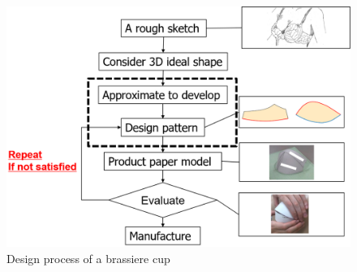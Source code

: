 \documentclass[E]{scitrans}
\begin{document}
\begin{figure}[h!]
	\centering
	\includegraphics[width= 1.0 \columnwidth]{./figure/DesignProcess2.eps}
	\caption{Design process of a brassiere cup}
	\label{fig:process}
\end{figure}

\end{document}
